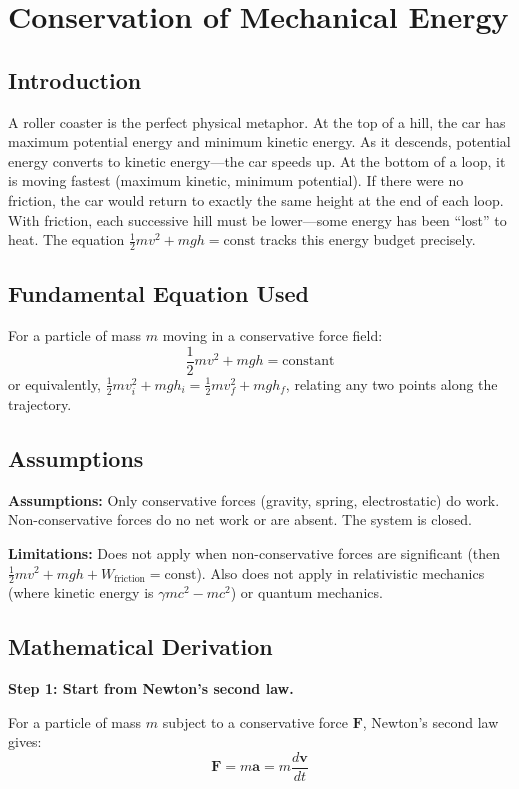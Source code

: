 \chapter{Conservation of Mechanical Energy}

\section*{Introduction}

A roller coaster is the perfect physical metaphor. At the top of a hill, the car has maximum potential energy and minimum kinetic energy. As it descends, potential energy converts to kinetic energy---the car speeds up. At the bottom of a loop, it is moving fastest (maximum kinetic, minimum potential). If there were no friction, the car would return to exactly the same height at the end of each loop. With friction, each successive hill must be lower---some energy has been ``lost'' to heat. The equation $\frac{1}{2}mv^2 + mgh = \text{const}$ tracks this energy budget precisely.
\section*{Fundamental Equation Used}

For a particle of mass $m$ moving in a conservative force field:
\[
\frac{1}{2}mv^2 + mgh = \text{constant}
\]
or equivalently, $\frac{1}{2}mv_i^2 + mgh_i = \frac{1}{2}mv_f^2 + mgh_f$, relating any two points along the trajectory.
\section*{Assumptions}

\textbf{Assumptions:} Only conservative forces (gravity, spring, electrostatic) do work. Non-conservative forces do no net work or are absent. The system is closed.


\textbf{Limitations:} Does not apply when non-conservative forces are significant (then $\frac{1}{2}mv^2 + mgh + W_{\text{friction}} = \text{const}$). Also does not apply in relativistic mechanics (where kinetic energy is $\gamma mc^2 - mc^2$) or quantum mechanics.


\section*{Mathematical Derivation}

\textbf{Step 1: Start from Newton's second law.}

For a particle of mass $m$ subject to a conservative force $\mathbf{F}$, Newton's second law gives:
\begin{equation}
\mathbf{F} = m\mathbf{a} = m\frac{d\mathbf{v}}{dt}
\end{equation}


